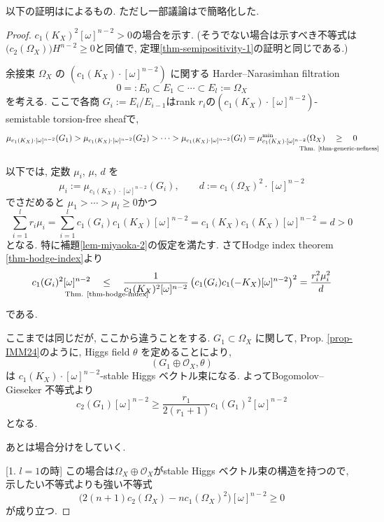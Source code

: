 \documentclass[dvipdfmx,a4paper,11pt]{article} %
\theoremstyle{definition}
\theoremstyle{remark}
\numberwithin{equation}{section}
\newcommand{\underalign}[2]{\quad \underset{\mathclap{\strut #1}}{#2}\quad}
\begin{document}
以下の証明は\cite{Miy87}によるもの. ただし一部議論は\cite{IMM24}で簡略化した. 
\begin{proof}
$c_1(K_X)^2 [\omega]^{n-2}>0$の場合を示す. (そうでない場合は示すべき不等式は$\bigl(c_2(\Omega_X)\bigr)H^{n-2} \geq 0$と同値で, 定理\ref{thm-semipositivity-1}の証明と同じである.)

余接束 \(\Omega_X\) の
$(c_1(K_X)\cdot [\omega]^{n-2})$
に関する Harder--Narasimhan filtration
\[
0=:E_0\subset E_1\subset \cdots \subset E_l:=\Omega_X
\]
を考える. ここで各商
\(G_i:=E_i/E_{i-1}
\)はrank $r_i$の$(c_1(K_X)\cdot [\omega]^{n-2})$-semistable torsion-free sheafで, 
$$
\mu_{c_1(K_X)\cdot [\omega]^{n-2}}(G_1)>
\mu_{c_1(K_X)\cdot [\omega]^{n-2}}(G_2)>
\cdots
>\mu_{c_1(K_X)\cdot [\omega]^{n-2}}(G_l)
=\mu^{\min}_{c_1(K_X)\cdot [\omega]^{n-2}}(\Omega_X) \underalign{\text{Thm. \ref{thm-generic-nefness}}}{\ge} 0
$$

以下では, 定数 \(\mu_i\), \(\mu\), \(d\) を
\[
\mu_i:=\mu_{c_1(K_X)\cdot [\omega]^{n-2}}(G_i),\qquad
d:=c_1(\Omega_X)^2\cdot [\omega]^{n-2}
\]
でさだめると
$\mu_1 > \cdots > \mu_l \geq 0$かつ
$$
\sum_{i=1}^{l}r_i\mu_i
=
\sum_{i=1}^{l}c_1(G_i) c_1(K_X)[\omega]^{n-2}
=
c_1(K_X) c_1(K_X)[\omega]^{n-2}
=
d >0
$$
となる. 特に補題\ref{lem-miyaoka-2}の仮定を満たす. 
さてHodge index theorem \ref{thm-hodge-index}より
\begin{equation}
\label{eq-miyaoka-4}
c_1(G_i)^2 [\omega]^{n-2}
\underalign{\text{Thm. \ref{thm-hodge-index}}}{\le} \frac{1}{c_1(K_X)^2[\omega]^{n-2}}
\left( c_1(G_i) c_1(-K_X) [\omega]^{n-2} \right)^2
=\frac{r_{i}^2 \mu_{i}^2}{d}
\end{equation}
である. 

ここまでは同じだが, ここから違うことをする. 
\(G_1\subset \Omega_X
\)
に関して, Prop. \ref{prop-IMM24}のように, Higgs field \(\theta\) を定めることにより,
\[
(G_1\oplus \mathcal{O}_X,\theta)
\]
は \(c_1(K_X)\cdot [\omega]^{n-2}\)-stable Higgs ベクトル束になる. 
よってBogomolov--Gieseker 不等式より
\begin{equation}
\label{eq-miyaoka-5}
c_2(G_1) [\omega]^{n-2}
\geq
\frac{r_1}{2(r_1+1)}c_1(G_1)^2 [\omega]^{n-2}
\end{equation}
となる. 


あとは場合分けをしていく.

[1. $l=1$の時]
この場合は$\Omega_{X} \oplus \mathcal{O}_X$がstable Higgs ベクトル束の構造を持つので, 示したい不等式よりも強い不等式
\[
\bigl(2(n+1)c_2(\Omega_X)-n c_1(\Omega_X)^2\bigr) [\omega]^{n-2}\geq 0
\]
が成り立つ. 



\end{proof}
\end{document}
